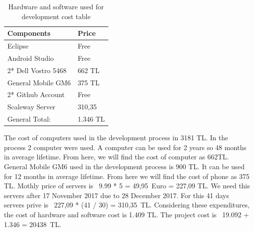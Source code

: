 \begin{table}[!h!]
\centering
\caption{Hardware and software used for development cost table}
\label{tab:hardsoftcost}
\begin{tabular}{|l|l|}
\hline
\textbf{Components}             & \multicolumn{1}{l|}{\textbf{Price}} \\ \hline
Eclipse \cite{eclipse} & Free \\ \hline
Android Studio \cite{androidStudio} & Free \\ \hline
2* Dell Vostro 5468 \cite{dell} & 662 TL \\ \hline
General Mobile GM6 \cite{gm6} & 375 TL                            \\ \hline
2* Github Account                  & Free                             \\ \hline
Scaleway Server                  & 310,35                            \\ \hline
General Total:                  & 1.346 TL                            \\ \hline
\end{tabular}
\end{table}
The cost of computers used in the development process in 3181 TL\cite{dell}. In the process 2 computer were used. A computer can be used for 2 years so 48 months in average lifetime. From here, we will find the cost of computer as 662TL. General Mobile GM6 used in the development process is 900 TL\cite{gm6}. It can be used for 12 months in average lifetime. From here we will find the cost of phone as 375 TL. Mothly price of servers is \ 9.99 * 5 = 49,95\ Euro = 227,09 TL. We need this servers after 17 November 2017 due to 28 December 2017. For this 41 days servers prive is \ 227,09 * (41 / 30) = 310,35\ TL. Considering these expenditures, the cost of hardware and software cost is 1.409 TL. The project cost is \ 19.092 + 1.346 = 20438\ TL.
